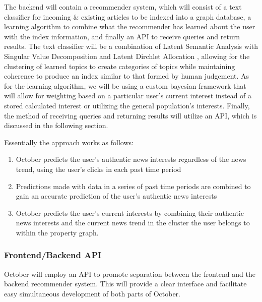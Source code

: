 \documentclass[11pt,letterpaper]{article}
\begin{document}
The backend will contain a recommender system, which will consist of a text
classifier for incoming \& existing articles to be indexed into a graph
database, a learning algorithm to combine what the recommender has learned about
the user with the index information, and finally an API to receive queries and
return results. The text classifier will be a combination of Latent Semantic
Analysis with Singular Value Decomposition and Latent Dirchlet Allocation
\cite{lda}, allowing for the clustering of learned topics to create categories
of topics while maintaining coherence to produce an index similar to that formed
by human judgement. As for the learning algorithm, we will be using a custom
bayesian framework \cite{bayesian} that will allow for weighting based on a particular user's current interest instead of a stored calculated interest or utilizing the general population's interests.
Finally, the method of receiving queries and returning results will utilize an API, which is discussed in the following section.

Essentially the approach works as follows:
    \begin{enumerate}
        \item October predicts the user’s authentic news interests regardless of the news trend, using the user’s clicks in each past time period
        \item Predictions made with data in a series of past time periods are combined to gain an accurate prediction of the user’s authentic news interests
        \item October predicts the user’s current interests by combining their authentic news interests and the current news trend in the cluster the user belongs to within the property graph.
    \end{enumerate}

\subsubsection{Frontend/Backend API}
\label{sec:api}
October will employ an API to promote separation between the frontend and the backend recommender system.
This will provide a clear interface and facilitate easy simultaneous development of both parts of October.
\end{document}
